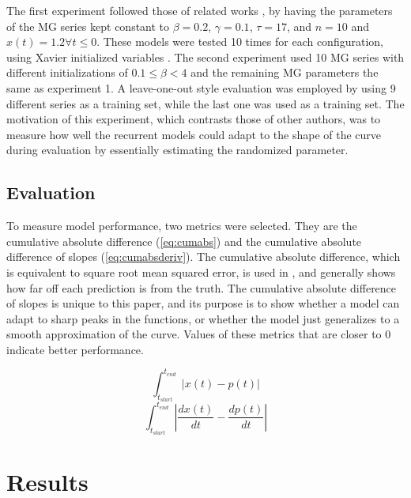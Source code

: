 \documentclass[11pt]{article}
\begin{document}
The first experiment followed those of related works \cite{tr, Farsa},
by having the
parameters of the MG series kept constant to $\beta = 0.2$,
$\gamma = 0.1$, $\tau = 17$, and $n = 10$ and $x(t)=1.2  \forall  t \leq 0$. These models were tested 10 times for each configuration, using Xavier initialized variables \cite{Xavier}. The second experiment used 10 MG series with different
initializations of $0.1 \leq \beta < 4$ and the remaining MG parameters the same as experiment 1. A leave-one-out style evaluation was employed by using 9 different series as a training
set, while the last one was used as a training set. The motivation of
this experiment, which contrasts those of other authors, was to measure
how well the recurrent models could adapt to the shape of the curve during
evaluation by essentially estimating the randomized parameter.

\subsection{Evaluation}
\label{sec-3-3}
To measure model performance, two metrics were selected. They are
the cumulative absolute difference (\ref{eq:cumabs}) and the
cumulative absolute difference of slopes
(\ref{eq:cumabsderiv}). The cumulative absolute difference, which is
equivalent to square root mean squared error, is used 
in \cite{Farsa}, and generally shows how far off each prediction
is from the truth. The cumulative absolute difference of slopes is
unique to this paper, and its purpose is to show whether a model can
adapt to sharp peaks in the functions, or whether the model just
generalizes to a smooth approximation of the curve. Values of these metrics that are closer to 0 indicate better performance.

\begin{equation}
  \int_{t_{start}}^{t_{end}} | x(t) - p(t) |
\label{eq:cumabs}
\end{equation}
\begin{equation}
  \int_{t_{start}}^{t_{end}} | \frac{dx(t)}{dt} - \frac{dp(t)}{dt} |
\label{eq:cumabsderiv}
\end{equation}

\section {Results}
\end{document}
